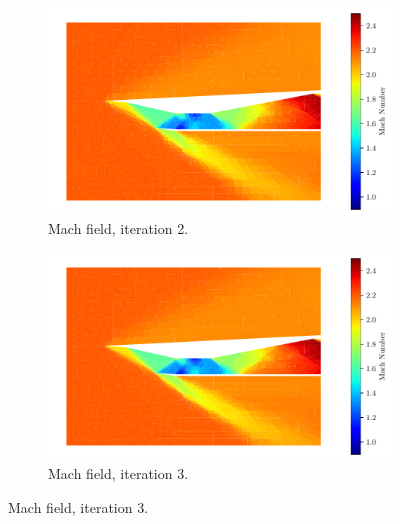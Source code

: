 \begin{figure}[h!]
    \begin{subfigure}[h]{0.49\linewidth}
        \centering
        \includegraphics[width=\linewidth]{rep/q4/Machfield2.pdf}
        \caption{Mach field, iteration 2.}
    \end{subfigure}
    \begin{subfigure}[h]{0.49\linewidth}
        \centering
        \includegraphics[width=\linewidth]{rep/q4/Machfield3.pdf}
        \caption{Mach field, iteration 3.}
    \end{subfigure}


\end{figure}
